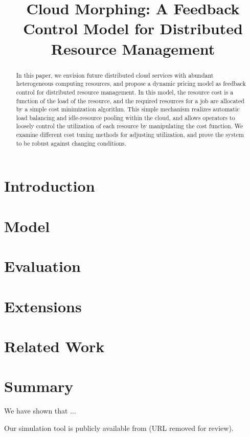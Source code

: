 \documentclass[10pt,sigconf,letterpaper,anonymous,nonacm]{acmart}
\title{Cloud Morphing: A Feedback Control Model for Distributed Resource Management}
\begin{document}
\begin{abstract}

In this paper, we envision future distributed cloud services with
abundant heterogeneous computing resources,
and propose a dynamic pricing model as feedback control for
distributed resource management.
In this model, the resource cost is a function of the load of the
resource, and the required resources for a job are allocated by a
simple cost minimization algorithm.  This simple mechanism realizes
automatic load balancing and idle-resource pooling within the cloud,
and allows operators to loosely control the utilization of each
resource by manipulating the cost function. We examine different cost
tuning methods for adjusting utilization, and prove the system to be
robust against changing conditions. 

\end{abstract}

\maketitle

\section{Introduction}



\section{Model}



\section{Evaluation}



\section{Extensions}



\section{Related Work}



\section{Summary}

We have shown that ...

Our simulation tool is publicly available from (URL removed for review).



\end{document}
